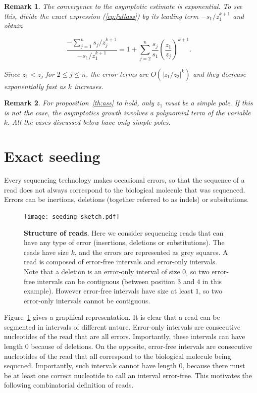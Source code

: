 \documentclass{article}
\newtheorem{remark}{Remark}
\begin{document}
\begin{remark}
The convergence to the asymptotic estimate is exponential. To see this,
divide the exact expression (\ref{eq:fullass}) by its leading term
$-s_1/z_1^{k+1}$ and obtain

\begin{equation*}
\frac{-\sum_{j=1}^n s_j/z_j^{k+1}}{-s_1/z_1^{k+1}} = 1 + \sum_{j=2}^n
\frac{s_j}{s_1} \left( \frac{z_1}{z_j} \right)^{k+1}.
\end{equation*}

Since $z_1 < z_j$ for $2 \leq j \leq n$, the error terms are
$O(|z_1/z_2|^k)$ and they decrease exponentially fast as $k$ increases.
\end{remark}

\begin{remark}
For proposition~\ref{th:ass} to hold, only $z_1$ must be a simple pole. If
this is not the case, the asymptotics growth involves a polynomial term of
the variable $k$. All the cases discussed below have only simple poles.
\end{remark}

\section{Exact seeding}

Every sequencing technology makes occasional errors, so that the sequence
of a read does not always correspond to the biological molecule that was
sequenced. Errors can be inertions, deletions (together referred to as
indels) or subsitutions.

\begin{figure}[h]
\centering
\texttt{[image: seeding\_sketch.pdf]}
\caption{\textbf{Structure of reads}. Here we consider sequencing reads
that can have any type of error (insertions, deletions or substitutions).
The reads have size $k$, and the errors are represented as grey squares. A
read is composed of error-free intervals and error-only intervals. Note
that a deletion is an error-only interval of size $0$, so two error-free
intervals can be contiguous (between position $3$ and $4$ in this
example). However error-free intervals have size at least $1$, so two
error-only intervals cannot be contiguous.}
\label{fig:sketchseed}
\end{figure}

Figure~\ref{fig:sketchseed} gives a graphical representation.  It is clear
that a read can be segmented in intervals of different nature.  Error-only
intervals are consecutive nucleotides of the read that are all errors.
Importantly, these intervals can have length $0$ because of deletions. On
the opposite, error-free intervals are consecutive nucleotides of the read
that all correspond to the biological molecule being sequcned.
Importantly, such intervals cannot have length $0$, because there must be
at least one correct nucleotide to call an interval error-free. This
motivates the following combinatorial definition of reads.
\end{document}
